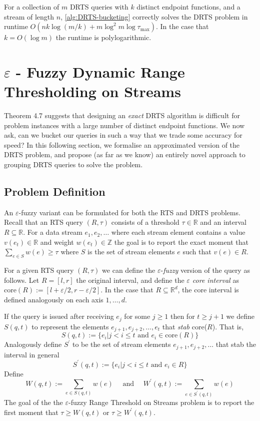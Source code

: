 \begin{theorem}
    For a collection of $m$ DRTS queries with $k$ distinct endpoint functions, and a stream of length $n$, \cref{alg:DRTS-bucketing} correctly solves the DRTS problem in runtime $O(nk\log(m/k) + m\log^2 m\log\tau_{\max})$. In the case that $k = O(\log m)$ the runtime is polylogarithmic.
\end{theorem}



\newpage
\section{$\varepsilon$ - Fuzzy Dynamic Range Thresholding on Streams}

Theorem 4.7 suggests that designing an \textit{exact} DRTS algorithm is difficult for problem instances with a large number of distinct endpoint functions. We now ask, can we bucket our queries in such a way that we trade some accuracy for speed? In this following section, we formalise an approximated version of the DRTS problem, and propose (as far as we know) an entirely novel approach to grouping DRTS queries to solve the problem.

\subsection{Problem Definition}

An $\varepsilon$-fuzzy variant can be formulated for both the RTS and DRTS problems.  Recall that an RTS query $(R, \tau)$ consists of a threshold $\tau \in\mathbb{R}$ and an interval $R \subseteq\mathbb{R}$. For a data stream $e_1,e_2,\dots$ where each stream element contains a value $v(e_t)\in\mathbb{R}$ and weight $w(e_t)\in\mathbb{Z}$ the goal is to report the exact moment that $\sum_{e\in S} w(e) \geq \tau$ where $S$ is the set of stream elements $e$ such that $v(e)\in R$. 

For a given RTS query $(R, \tau)$ we can define the $\varepsilon$-\textit{fuzzy} version of the query as follows. Let $R = [l, r]$ the original interval, and define the \textit{$\varepsilon$ core interval} as $\text{core}(R) := [l+\varepsilon/2, r-\varepsilon/2]$. In the case that $R\subseteq\mathbb{R}^d$, the core interval is defined analogously on each axis $1,\dots,d$.  

If the query is issued after receiving $e_j$ for some $j\geq 1$ then for $t\geq j+1$ we define $S(q,t)$ to represent the elements $e_{j+1},e_{j+2},\dots,e_t$ that \textit{stab} core($R$). That is, 
$$S(q, t) := \{e_i | j < i \leq t \text{ and } e_i \in \text{core}(R)\}$$
Analogously define $S^\prime$ to be the set of stream elements $e_{j+1},e_{j+2},\dots$ that stab the interval in general
$$S^\prime(q, t) := \{e_i | j < i \leq t \text{ and } e_i \in R\}$$
Define
$$W(q, t) := \sum_{e\in S(q,t)}w(e) \quad \text{ and } \quad W^\prime(q, t) := \sum_{e\in S^\prime(q,t)}w(e)$$
The goal of the the $\varepsilon$-fuzzy Range Threshold on Streams problem is to report the first moment that $\tau\geq W(q,t)$ or $\tau \geq W^\prime(q,t)$.

